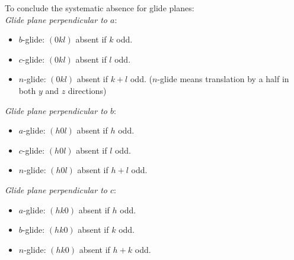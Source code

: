 \documentclass{article}
\theoremstyle{plain}\theoremheaderfont{\normalfont\itshape}\theorembodyfont{\rmfamily}\theoremseparator{.}\newtheorem*{rem}{Remark}\newtheorem*{ex}{Example}\newtheorem*{proof}{Proof}\newtheorem*{altp}{Alternative proof}
\theoremstyle{plain}\theoremheaderfont{\normalfont\bfseries}\theorembodyfont{\rmfamily}\theoremseparator{.}\newtheorem{thm}{Theorem}[section]\newtheorem{lem}[thm]{Lemma}\newtheorem{prop}[thm]{Proposition}\newtheorem*{cor}{Corollary}\newtheorem{defn}[thm]{Definition}\newtheorem{clm}[thm]{Claim}\newtheorem{clminproof}{Claim}\newtheorem*{law}{Law}\newtheorem{pos}[thm]{Postulate}
\theoremstyle{break}\theoremheaderfont{\normalfont\itshape}\theorembodyfont{\rmfamily}\theoremseparator{.\medskip}\newtheorem*{proofskip}{Proof}\newtheorem*{exs}{Examples}\newtheorem*{rems}{Remarks}
\theoremstyle{break}\theoremheaderfont{\normalfont\bfseries}\theorembodyfont{\rmfamily}\theoremseparator{.\medskip}\newtheorem{lemskip}[thm]{Lemma}\newtheorem{defnskip}[thm]{Definition}\newtheorem{propskip}[thm]{Proposition}\newtheorem{thmskip}[thm]{Theorem}
\numberwithin{equation}{section}
\begin{document}
    To conclude the systematic absence for glide planes: \\
    \textit{Glide plane perpendicular to \(a\)}:
    \begin{itemize}[topsep=0pt]
        \item \(b\)-glide: \((0kl)\) absent if \(k\) odd.
        \item \(c\)-glide: \((0kl)\) absent if \(l\) odd.
        \item \(n\)-glide: \((0kl)\) absent if \(k+l\) odd. (\(n\)-glide means translation by a half in both \(y\) and \(z\) directions)
    \end{itemize}
    \textit{Glide plane perpendicular to \(b\)}:
    \begin{itemize}[topsep=0pt]
        \item \(a\)-glide: \((h0l)\) absent if \(h\) odd.
        \item \(c\)-glide: \((h0l)\) absent if \(l\) odd.
        \item \(n\)-glide: \((h0l)\) absent if \(h+l\) odd.
    \end{itemize}
    \textit{Glide plane perpendicular to \(c\)}:
    \begin{itemize}[topsep=0pt]
        \item \(a\)-glide: \((hk0)\) absent if \(h\) odd.
        \item \(b\)-glide: \((hk0)\) absent if \(k\) odd.
        \item \(n\)-glide: \((hk0)\) absent if \(h+k\) odd.
    \end{itemize}
\end{document}
